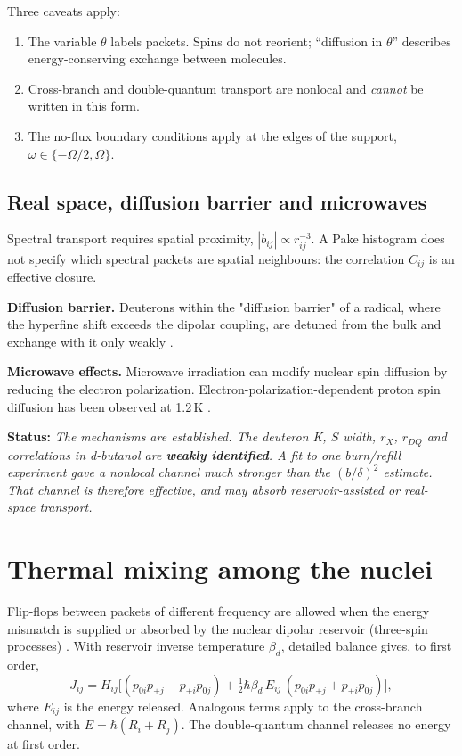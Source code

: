 \documentclass[11pt]{article}
\newcommand{\status}[1]{\par\noindent\textbf{\textsf{Status:}} \emph{#1}\par}
\begin{document}
Three caveats apply:
\begin{enumerate}
\item The variable $\theta$ labels packets. Spins do not reorient; ``diffusion in $\theta$''
describes energy-conserving exchange between molecules.
\item Cross-branch and double-quantum transport are nonlocal and \emph{cannot} be written in
this form.
\item The no-flux boundary conditions apply at the edges of the support,
$\omega\in\{-\Omega/2,\Omega\}$.
\end{enumerate}

\subsection{Real space, diffusion barrier and microwaves}
\label{sec:barrier}
Spectral transport requires spatial proximity, $|b_{ij}|\propto r_{ij}^{-3}$. A Pake histogram
does not specify which spectral packets are spatial neighbours: the correlation $C_{ij}$ is an
effective closure.

\textbf{Diffusion barrier.} Deuterons within the "diffusion barrier" of a radical, where the
hyperfine shift exceeds the dipolar coupling, are detuned from the bulk and exchange with it
only weakly \cite{Khutsishvili1966,AbragamGoldman1978,Wenckebach2016}.

\textbf{Microwave effects.} Microwave irradiation can modify nuclear spin diffusion by reducing
the electron polarization. Electron-polarization-dependent proton spin diffusion has been
observed at 1.2\,K \cite{Chessari2023}.

\status{The mechanisms are established. The deuteron K, $S$ width, $r_X$, $r_{DQ}$ and
correlations in d-butanol are \textbf{weakly identified}. A fit to one burn/refill experiment
gave a nonlocal channel much stronger than the $(b/\delta)^2$ estimate. That channel is
therefore effective, and may absorb reservoir-assisted or real-space transport.}

\section{Thermal mixing among the nuclei}
\label{sec:thermalmix}
Flip-flops between packets of different frequency are allowed when the energy mismatch is
supplied or absorbed by the nuclear dipolar reservoir (three-spin processes)
\cite{Goldman1970,AbragamGoldman1982}. With reservoir inverse temperature $\beta_d$, detailed
balance gives, to first order,
\begin{equation}
J_{ij}=H_{ij}\Big[(p_{0i}p_{+j}-p_{+i}p_{0j})+\tfrac12\hbar\beta_d\,E_{ij}\,(p_{0i}p_{+j}+p_{+i}p_{0j})\Big],
\label{eq:mixing}
\end{equation}
where $E_{ij}$ is the energy released. Analogous terms apply to the cross-branch channel, with
$E=\hbar(R_i+R_j)$. The double-quantum channel releases no energy at first order.
\end{document}
